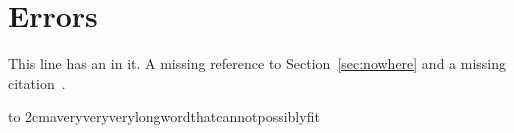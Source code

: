 \documentclass{article}
\begin{document}
\section{Errors}

This line has an \undefinedmacro{} in it.
A missing reference to Section~\ref{sec:nowhere} and a missing citation~\cite{nokey}.


\noindent\hbox to 2cm{averyveryverylongwordthatcannotpossiblyfit}
\end{document}

